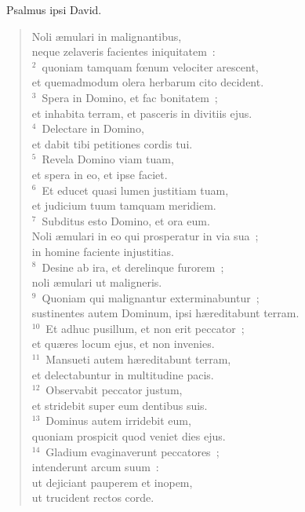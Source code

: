 ~\lettrine[lines=10,image=true,loversize=0.05,lraise=-0.03]{P}{}salmus ipsi David. \begin{flushleft}\begin{verse}\vspace{6pt}Noli \ae mulari in malignantibus,\\ neque zelaveris facientes iniquitatem~:\\
${}^{2}$~quoniam tamquam fœnum velociter arescent,\\ et quemadmodum olera herbarum cito decident.\\
${}^{3}$~Spera in Domino, et fac bonitatem~;\\ et inhabita terram, et pasceris in divitiis ejus.\\
${}^{4}$~Delectare in Domino,\\ et dabit tibi petitiones cordis tui.\\
${}^{5}$~Revela Domino viam tuam,\\ et spera in eo, et ipse faciet.\\
${}^{6}$~Et educet quasi lumen justitiam tuam,\\ et judicium tuum tamquam meridiem.\\
${}^{7}$~Subditus esto Domino, et ora eum.\\ Noli \ae mulari in eo qui prosperatur in via sua~;\\ in homine faciente injustitias.\\
${}^{8}$~Desine ab ira, et derelinque furorem~;\\ noli \ae mulari ut maligneris.\\
${}^{9}$~Quoniam qui malignantur exterminabuntur~;\\ sustinentes autem Dominum, ipsi h\ae reditabunt terram.\\
${}^{10}$~Et adhuc pusillum, et non erit peccator~;\\ et qu\ae res locum ejus, et non invenies.\\
${}^{11}$~Mansueti autem h\ae reditabunt terram,\\ et delectabuntur in multitudine pacis.\\
${}^{12}$~Observabit peccator justum,\\ et stridebit super eum dentibus suis.\\
${}^{13}$~Dominus autem irridebit eum,\\ quoniam prospicit quod veniet dies ejus.\\
${}^{14}$~Gladium evaginaverunt peccatores~;\\ intenderunt arcum suum~:\\ ut dejiciant pauperem et inopem,\\ ut trucident rectos corde.\\

\end{verse}
\end{flushleft}
